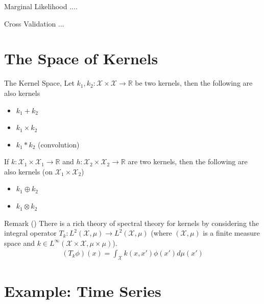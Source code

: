 \documentclass[10pt]{beamer}
\begin{document}
\begin{frame}{Marginal Likelihood}
....
\end{frame}

\begin{frame}{Cross Validation}
...
\end{frame}


\section{The Space of Kernels}

\begin{frame}{The Kernel Space}{\cite{ROERGA}, \cite[Chapter 4]{RW05}}
Let $k_1, k_2: \mathcal{X}\times\mathcal{X}\longrightarrow \mathbb{R}$ be two kernels, then the following are also kernels 
\begin{itemize}
\item $k_1 + k_2$ 
\item $k_1 \times k_2$
\item $k_1*k_2$ (convolution)
\end{itemize}
If $k: \mathcal{X}_1\times\mathcal{X}_1\longrightarrow \mathbb{R}$ and $h: \mathcal{X}_2\times\mathcal{X}_2\longrightarrow \mathbb{R}$ are two kernels, then the following are also kernels (on $\mathcal{X}_1 \times \mathcal{X}_2$)
\begin{itemize}
\item $k_1 \oplus k_2$ 
\item $k_1 \otimes k_2$
\end{itemize}
\begin{block}{Remark (\cite[Chapter 4.3]{RW05})}
There is a rich theory of spectral theory for kernels by considering the integral operator $T_k : L^2(\mathcal{X}, \mu) \longrightarrow L^2(\mathcal{X}, \mu)$ (where $(\mathcal{X}, \mu)$ is a finite measure space and $k\in L^{\infty}(\mathcal{X}\times \mathcal{X} , \mu\times\mu)$). 
\begin{align*}
(T_k\phi)(x) = \int_{\mathcal{X}} k(x, x')\phi(x') d\mu(x')
\end{align*}
\end{block}
\end{frame}

\section{Example: Time Series}
\end{document}
